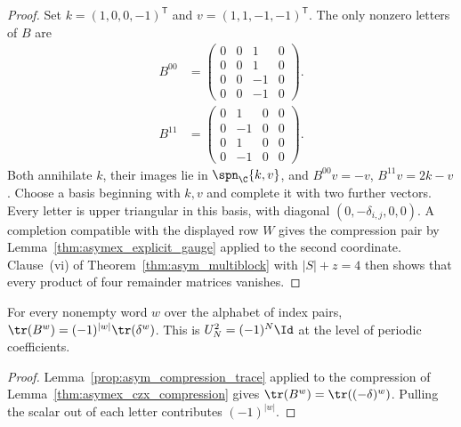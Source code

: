 \begin{proof}
    \leanok
    Set $k=(1,0,0,-1)^{\mathsf T}$ and
    $v=(1,1,-1,-1)^{\mathsf T}$. The only nonzero letters of $B$ are
    \begin{align}
        B^{00} & =\begin{pmatrix}
                      0 & 0 & 1  & 0 \\
                      0 & 0 & 1  & 0 \\
                      0 & 0 & -1 & 0 \\
                      0 & 0 & -1 & 0
                  \end{pmatrix}.
        \label{eq:asymex_czx_bzero}
    \end{align}
    \begin{align}
        B^{11} & =\begin{pmatrix}
                      0 & 1  & 0 & 0 \\
                      0 & -1 & 0 & 0 \\
                      0 & 1  & 0 & 0 \\
                      0 & -1 & 0 & 0
                  \end{pmatrix}.
        \label{eq:asymex_czx_bone}
    \end{align}
    Both annihilate $k$, their images lie in $\spn_{\C}\{k,v\}$,
    and $B^{00}v=-v$, $B^{11}v=2k-v$. Choose a basis beginning
    with $k,v$ and complete it with two further vectors. Every letter
    is upper triangular in this basis, with diagonal
    $(0,-\delta_{i,j},0,0)$. A completion compatible with the displayed
    row $W$ gives the compression pair by
    Lemma~\ref{thm:asymex_explicit_gauge} applied to the second
    coordinate. Clause~(vi) of Theorem~\ref{thm:asym_multiblock} with
    $|S|+z=4$ then shows that every product of four remainder matrices
    vanishes.
\end{proof}

\begin{lemma}
    \label{thm:asymex_czx_trace}
    \leanok
    For every nonempty word $w$ over the alphabet of index pairs,
    $\tr(B^w)=(-1)^{|w|}\tr(\delta^w)$. This is
    $U_N^2=(-1)^N\Id$ at the level of periodic coefficients.
\end{lemma}

\begin{proof}
    \leanok
    Lemma~\ref{prop:asym_compression_trace} applied to the compression
    of Lemma~\ref{thm:asymex_czx_compression} gives
    $\tr(B^w)=\tr((-\delta)^w)$. Pulling the scalar out of
    each letter contributes $(-1)^{|w|}$.
\end{proof}

